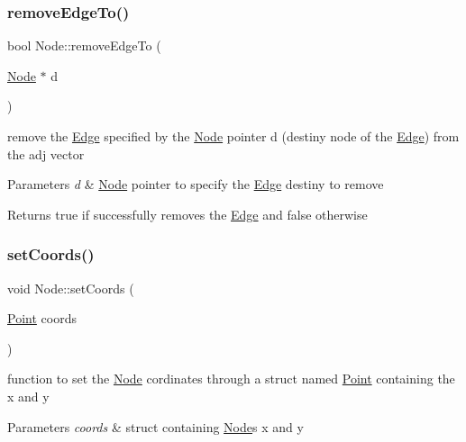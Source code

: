 \subsubsection{\texorpdfstring{remove\+Edge\+To()}{removeEdgeTo()}}
{\footnotesize\ttfamily bool Node\+::remove\+Edge\+To (\begin{DoxyParamCaption}\item[{\hyperlink{class_node}{Node} $\ast$}]{d }\end{DoxyParamCaption})}



remove the \hyperlink{class_edge}{Edge} specified by the \hyperlink{class_node}{Node} pointer d (destiny node of the \hyperlink{class_edge}{Edge}) from the adj vector 


\begin{DoxyParams}{Parameters}
{\em d} & \hyperlink{class_node}{Node} pointer to specify the \hyperlink{class_edge}{Edge} destiny to remove \\
\hline
\end{DoxyParams}
\begin{DoxyReturn}{Returns}
true if successfully removes the \hyperlink{class_edge}{Edge} and false otherwise 
\end{DoxyReturn}
\mbox{\label{class_node_af5baac137a6dbe502c671c6fef993223}} 
\subsubsection{\texorpdfstring{set\+Coords()}{setCoords()}}
{\footnotesize\ttfamily void Node\+::set\+Coords (\begin{DoxyParamCaption}\item[{\hyperlink{struct_point}{Point}}]{coords }\end{DoxyParamCaption})}



function to set the \hyperlink{class_node}{Node} cordinates through a struct named \hyperlink{struct_point}{Point} containing the x and y 


\begin{DoxyParams}{Parameters}
{\em coords} & struct containing \hyperlink{class_node}{Node}\textquotesingle{}s x and y \\
\hline
\end{DoxyParams}
\mbox{\label{class_node_a4bfac5a526a40c0d41429892760722c6}} 
